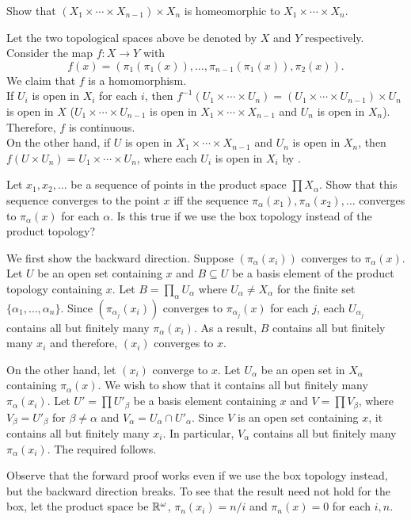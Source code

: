 	\setcounter{exercise}{3}
	\begin{exercise}
		Show that $(X_1\times \cdots\times X_{n-1})\times X_n$ is homeomorphic to $X_1\times\cdots\times X_n$.
	\end{exercise}
	\begin{solution*}
		Let the two topological spaces above be denoted by $X$ and $Y$ respectively. Consider the map $f:X\to Y$ with
		\[ f(x) = (\pi_1(\pi_1(x)), \ldots, \pi_{n-1}(\pi_1(x)), \pi_2(x)). \]
		We claim that $f$ is a homomorphism.\\
		If $U_i$ is open in $X_i$ for each $i$, then $f^{-1}(U_1\times\cdots\times U_n)=(U_1\times\cdots\times U_{n-1})\times U_n$ is open in $X$ ($U_1\times\cdots\times U_{n-1}$ is open in $X_1\times\cdots\times X_{n-1}$ and $U_n$ is open in $X_n$). Therefore, $f$ is continuous.\\
		On the other hand, if $U$ is open in $X_1\times\cdots\times X_{n-1}$ and $U_n$ is open in $X_n$, then $f(U\times U_n) = U_1\times\cdots\times U_n$, where each $U_i$ is open in $X_i$ by .
	\end{solution*}

	\setcounter{exercise}{5}
	\begin{exercise}
		Let $x_1,x_2,\ldots$ be a sequence of points in the product space $\prod X_\alpha$. Show that this sequence converges to the point $x$ iff the sequence $\pi_\alpha(x_1),\pi_\alpha(x_2),\ldots$ converges to $\pi_\alpha(x)$ for each $\alpha$. Is this true if we use the box topology instead of the product topology?
	\end{exercise}
	\begin{solution*}
		We first show the backward direction. Suppose $(\pi_\alpha(x_i))$ converges to $\pi_\alpha(x)$. Let $U$ be an open set containing $x$ and $B\subseteq U$ be a basis element of the product topology containing $x$. Let $B=\prod_\alpha U_\alpha$ where $U_\alpha\neq X_\alpha$ for the finite set $\{\alpha_1,\ldots,\alpha_n\}$. Since $(\pi_{\alpha_j}(x_i))$ converges to $\pi_{\alpha_j}(x)$ for each $j$, each $U_{\alpha_j}$ contains all but finitely many $\pi_\alpha(x_i)$. As a result, $B$ contains all but finitely many $x_i$ and therefore, $(x_i)$ converges to $x$.

		On the other hand, let $(x_i)$ converge to $x$. Let $U_\alpha$ be an open set in $X_\alpha$ containing $\pi_\alpha(x)$. We wish to show that it contains all but finitely many $\pi_\alpha(x_i)$. Let $U'=\prod U'_\beta$ be a basis element containing $x$ and $V=\prod V_\beta$, where $V_\beta=U'_\beta$ for $\beta\neq\alpha$ and $V_\alpha=U_\alpha\cap U'_\alpha$. Since $V$ is an open set containing $x$, it contains all but finitely many $x_i$. In particular, $V_\alpha$ contains all but finitely many $\pi_\alpha(x_i)$. The required follows.


		Observe that the forward proof works even if we use the box topology instead, but the backward direction breaks. To see that the result need not hold for the box, let the product space be $\mathbb{R}^\omega$, $\pi_n(x_i)=n/i$ and $\pi_n(x)=0$ for each $i,n$.
	\end{solution*}

